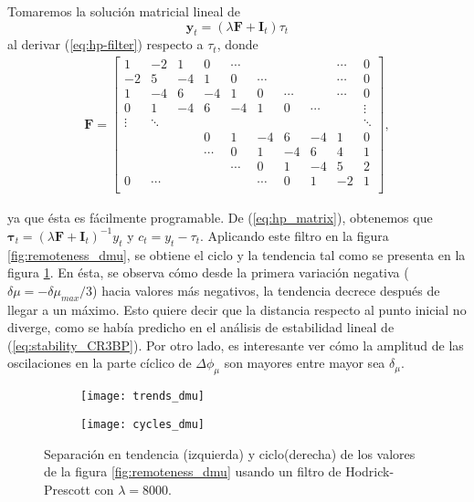 Tomaremos la solución matricial lineal de \cite{Kim2004}  
\begin{equation}
 \mathbf{y}_t = \left( \lambda \mathbf{F} + \mathbf{I}_t \right) \tau_t
 \label{eq:hp_matrix}
\end{equation}  
al derivar (\ref{eq:hp-filter}) respecto a $\tau_t$, donde
\begin{align}
 \mathbf{F} = \left[ \begin{array}{cccccccccc}
 1  & -2 & 1  & 0  & \cdots &        &        & & \cdots & 0    \\
 -2 & 5  & -4 & 1  & 0      & \cdots &        & & \cdots & 0    \\
 1  & -4 & 6  & -4 & 1      & 0      & \cdots & & \cdots & 0    \\
 0  & 1  & -4 & 6  & -4 & 1 & 0      & \cdots &        & \vdots \\
 \vdots  & \ddots  &  &  &  &  &  &  &        & \ddots          \\
    &    &    &  0 &  1 &-4 &    6   & -4     &      1 & 0      \\
   &   &  & \cdots &  0 & 1 &   -4   &  6     &      4 & 1      \\
   &   &  &  &   \cdots & 0 &    1   &  -4    &      5 & 2      \\
 0 &\cdots&  &  &  & \cdots &    0   &   1    &     -2 & 1      \\
 \end{array} \right],
\end{align}

ya que ésta es fácilmente programable. De (\ref{eq:hp_matrix}), obtenemos que $\mathbf{\tau}_t = \left( \lambda \mathbf{F} + \mathbf{I}_t \right)^{-1} y_t$ y $c_t = y_t - \tau_t$. Aplicando este filtro en la figura \ref{fig:remoteness_dmu}, se obtiene el ciclo y la tendencia tal como se presenta en la figura \ref{fig:trendcycle_dmu}. En ésta, se observa cómo desde la primera variación negativa ($\delta\mu = -\delta\mu_{max}/3$) hacia valores más negativos, la tendencia decrece después de llegar a un máximo. Esto quiere decir que la distancia respecto al punto inicial no diverge, como se había predicho en el análisis de estabilidad lineal de (\ref{eq:stability_CR3BP}). Por otro lado, es interesante ver cómo la amplitud de las oscilaciones en la parte cíclico de $\Delta\phi_\mu$ son mayores entre mayor sea $\delta_\mu$.

\begin{figure}[h!]
\centering
\begin{subfigure}{0.49\textwidth}
	\centering
	\texttt{[image: trends\_dmu]}
\end{subfigure}
%
\begin{subfigure}{0.49\textwidth}
	\centering
	\texttt{[image: cycles\_dmu]}
\end{subfigure}
\caption{ Separación en tendencia (izquierda) y ciclo(derecha) de los valores de la figura \ref{fig:remoteness_dmu} usando un filtro de Hodrick-Prescott con $\lambda = 8000$.}
\label{fig:trendcycle_dmu}
\end{figure}

